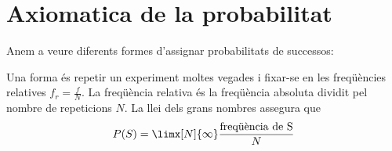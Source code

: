
\section{Axiomatica de la probabilitat}

Anem a veure diferents formes d'assignar probabilitats de successos:

\begin{theorybox}
	Una forma és repetir un experiment moltes vegades i fixar-se en les freqüències relatives $f_r = \frac{f}{N}$. La freqüència relativa és la freqüència absoluta dividit pel nombre de repeticions $N$. La llei dels grans nombres assegura que
	 \begin{equation}
		P(S) = \limx[N]{\infty} \dfrac{\text{freqüència de S}}{N}
	\end{equation}
\end{theorybox}
 
